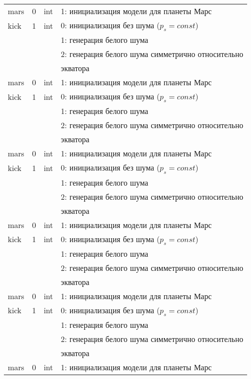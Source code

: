 \begin{longtable}[c]{|l|c|l|l|}
 mars & 0 & int & 1: инициализация модели для планеты Марс     \\
kick & 1 & int & 0: инициализация без шума ($p_s = const$) \\
      &   &     & 1: генерация белого шума                  \\
      &   &     & 2: генерация белого шума симметрично относительно \\
  & & & экватора    \\
 mars & 0 & int & 1: инициализация модели для планеты Марс     \\
kick & 1 & int & 0: инициализация без шума ($p_s = const$) \\
      &   &     & 1: генерация белого шума                  \\
      &   &     & 2: генерация белого шума симметрично относительно \\
  & & & экватора    \\
 mars & 0 & int & 1: инициализация модели для планеты Марс     \\
kick & 1 & int & 0: инициализация без шума ($p_s = const$) \\
      &   &     & 1: генерация белого шума                  \\
      &   &     & 2: генерация белого шума симметрично относительно \\
  & & & экватора    \\
 mars & 0 & int & 1: инициализация модели для планеты Марс     \\
kick & 1 & int & 0: инициализация без шума ($p_s = const$) \\
      &   &     & 1: генерация белого шума                  \\
      &   &     & 2: генерация белого шума симметрично относительно \\
  & & & экватора    \\
 mars & 0 & int & 1: инициализация модели для планеты Марс     \\
kick & 1 & int & 0: инициализация без шума ($p_s = const$) \\
      &   &     & 1: генерация белого шума                  \\
      &   &     & 2: генерация белого шума симметрично относительно \\
  & & & экватора    \\
 mars & 0 & int & 1: инициализация модели для планеты Марс     \\ 
 \hline 
\end{longtable}

